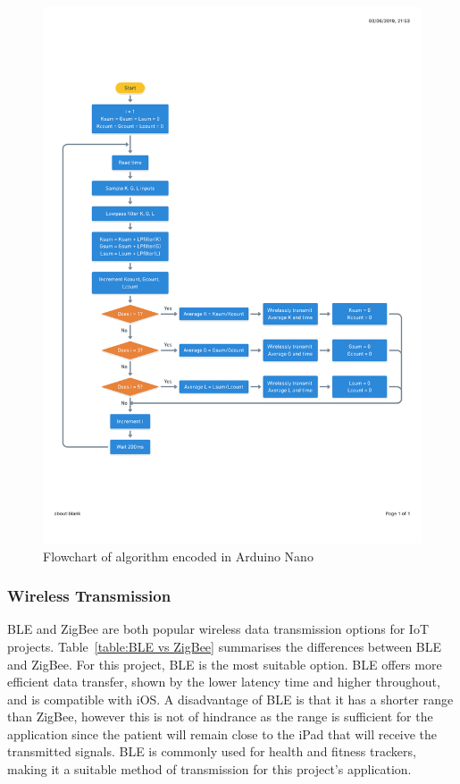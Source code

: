 \begin{figure}[t!]
\centering
\includegraphics[trim={1cm 5cm 1cm  4cm}, clip, width=1\textwidth]{./figures/psuedocode.pdf}
\captionsetup{justification=centering}
\caption{Flowchart of algorithm encoded in Arduino Nano}
\label{fig: psuedocode}
\end{figure}



\subsubsection{Wireless Transmission}
BLE and ZigBee are both popular wireless data transmission options for IoT projects. Table~\ref{table:BLE vs ZigBee} summarises the differences between BLE and ZigBee. For this project, BLE is the most suitable option. BLE offers more efficient data transfer, shown by the lower latency time and higher throughout, and is compatible with iOS. A disadvantage of BLE is that it has a shorter range than ZigBee, however this is not of hindrance as the range is sufficient for the application since the patient will remain close to the iPad that will receive the transmitted signals. BLE is commonly used for health and fitness trackers, making it a suitable method of transmission for this project's application.

